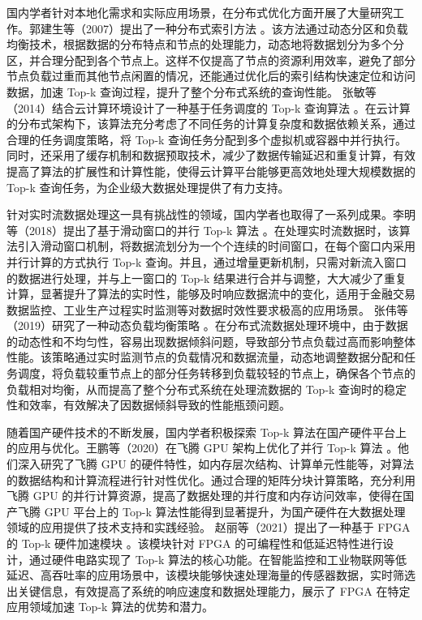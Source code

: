国内学者针对本地化需求和实际应用场景，在分布式优化方面开展了大量研究工作。郭建生等（2007）提出了一种分布式索引方法 \cite {guo2007distributed}。该方法通过动态分区和负载均衡技术，根据数据的分布特点和节点的处理能力，动态地将数据划分为多个分区，并合理分配到各个节点上。这样不仅提高了节点的资源利用效率，避免了部分节点负载过重而其他节点闲置的情况，还能通过优化后的索引结构快速定位和访问数据，加速 Top-k 查询过程，提升了整个分布式系统的查询性能。
张敏等（2014）结合云计算环境设计了一种基于任务调度的 Top-k 查询算法 \cite {zhang2014efficient}。在云计算的分布式架构下，该算法充分考虑了不同任务的计算复杂度和数据依赖关系，通过合理的任务调度策略，将 Top-k 查询任务分配到多个虚拟机或容器中并行执行。同时，还采用了缓存机制和数据预取技术，减少了数据传输延迟和重复计算，有效提高了算法的扩展性和计算性能，使得云计算平台能够更高效地处理大规模数据的 Top-k 查询任务，为企业级大数据处理提供了有力支持。

针对实时流数据处理这一具有挑战性的领域，国内学者也取得了一系列成果。李明等（2018）提出了基于滑动窗口的并行 Top-k 算法 \cite {li2018parallel}。在处理实时流数据时，该算法引入滑动窗口机制，将数据流划分为一个个连续的时间窗口，在每个窗口内采用并行计算的方式执行 Top-k 查询。并且，通过增量更新机制，只需对新流入窗口的数据进行处理，并与上一窗口的 Top-k 结果进行合并与调整，大大减少了重复计算，显著提升了算法的实时性，能够及时响应数据流中的变化，适用于金融交易数据监控、工业生产过程实时监测等对数据时效性要求极高的应用场景。
张伟等（2019）研究了一种动态负载均衡策略 \cite {zhang2019top}。在分布式流数据处理环境中，由于数据的动态性和不均匀性，容易出现数据倾斜问题，导致部分节点负载过高而影响整体性能。该策略通过实时监测节点的负载情况和数据流量，动态地调整数据分配和任务调度，将负载较重节点上的部分任务转移到负载较轻的节点上，确保各个节点的负载相对均衡，从而提高了整个分布式系统在处理流数据的 Top-k 查询时的稳定性和效率，有效解决了因数据倾斜导致的性能瓶颈问题。

随着国产硬件技术的不断发展，国内学者积极探索 Top-k 算法在国产硬件平台上的应用与优化。王鹏等（2020）在飞腾 GPU 架构上优化了并行 Top-k 算法 \cite {wang2020gpu}。他们深入研究了飞腾 GPU 的硬件特性，如内存层次结构、计算单元性能等，对算法的数据结构和计算流程进行针对性优化。通过合理的矩阵分块计算策略，充分利用飞腾 GPU 的并行计算资源，提高了数据处理的并行度和内存访问效率，使得在国产飞腾 GPU 平台上的 Top-k 算法性能得到显著提升，为国产硬件在大数据处理领域的应用提供了技术支持和实践经验。
赵丽等（2021）提出了一种基于 FPGA 的 Top-k 硬件加速模块 \cite {zhaoli2021fpga}。该模块针对 FPGA 的可编程性和低延迟特性进行设计，通过硬件电路实现了 Top-k 算法的核心功能。在智能监控和工业物联网等低延迟、高吞吐率的应用场景中，该模块能够快速处理海量的传感器数据，实时筛选出关键信息，有效提高了系统的响应速度和数据处理能力，展示了 FPGA 在特定应用领域加速 Top-k 算法的优势和潜力。

